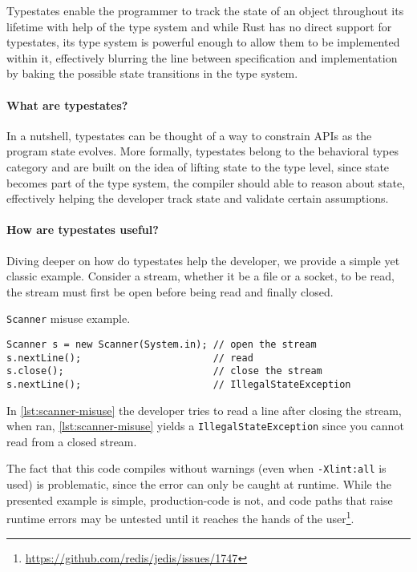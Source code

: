 \documentclass[a4paper, 10pt]{article}
\newenvironment{code}{\captionsetup{type=listing}}{}
\begin{document}
Typestates enable the programmer to track the state of an object throughout its lifetime with help of the type system
and while Rust has no direct support for typestates,
its type system is powerful enough to allow them to be implemented within it,
effectively blurring the line between specification and implementation by baking the possible state transitions in the type system.



\paragraph{What are typestates?}

In a nutshell, typestates can be thought of a way to constrain APIs as the program state evolves.
More formally, typestates belong to the behavioral types category and are built on the idea of lifting state to the type level,
since state becomes part of the type system, the compiler should able to reason about state,
effectively helping the developer track state and validate certain assumptions.

\paragraph{How are typestates useful?}

Diving deeper on how do typestates help the developer, we provide a simple yet classic example.
Consider a stream, whether it be a file or a socket, to be read, the stream must first be open before being read and finally closed.

\begin{code}
    \caption{\texttt{Scanner} misuse example.}
    \label{lst:scanner-misuse}
    \begin{verbatim}
Scanner s = new Scanner(System.in); // open the stream
s.nextLine();                       // read
s.close();                          // close the stream
s.nextLine();                       // IllegalStateException
    \end{verbatim}
\end{code}

In \autoref{lst:scanner-misuse} the developer tries to read a line after closing the stream,
when ran, \autoref{lst:scanner-misuse} yields a \texttt{IllegalStateException} since you cannot read from a closed stream.

The fact that this code compiles without warnings (even when \texttt{-Xlint:all} is used) is problematic,
since the error can only be caught at runtime.
While the presented example is simple, production-code is not,
and code paths that raise runtime errors may be untested until it reaches the hands of the user\footnote{\url{https://github.com/redis/jedis/issues/1747}}.
\end{document}

